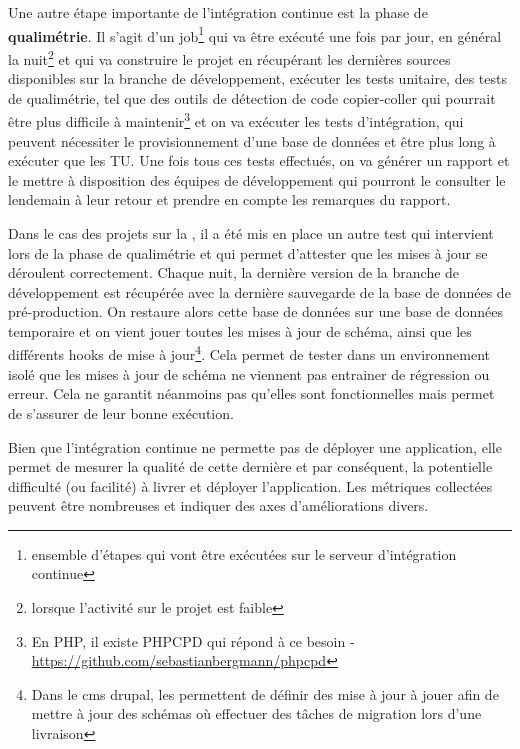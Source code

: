 Une autre étape importante de l'intégration continue est la phase de \textbf{qualimétrie}. Il s'agit d'un job\footnote{ensemble d'étapes qui vont être exécutées sur le serveur d'intégration continue} qui va être exécuté une fois par jour, en général la nuit\footnote{lorsque l'activité sur le projet est faible} et qui va construire le projet en récupérant les dernières sources disponibles sur la branche de développement, exécuter les tests unitaire, des tests de qualimétrie, tel que des outils de détection de code  copier-coller qui pourrait être plus difficile à maintenir\footnote{En \gls{PHP}, il existe PHPCPD qui répond à ce besoin - \url{https://github.com/sebastianbergmann/phpcpd}} et on va exécuter les tests d'intégration, qui peuvent nécessiter le provisionnement d'une base de données et être plus long à exécuter que les \gls{TU}. Une fois tous ces tests effectués, on va générer un rapport et le mettre à disposition des équipes de développement qui pourront le consulter le lendemain à leur retour et prendre en compte les remarques du rapport. 

Dans le cas des projets sur la \naq{}, il a été mis en place un autre test qui intervient lors de la phase de qualimétrie et qui permet d'attester que les mises à jour se déroulent correctement. Chaque nuit, la dernière version de la branche de développement est récupérée avec la dernière sauvegarde de la base de données de pré-production. On restaure alors cette base de données sur une base de données temporaire et on vient jouer toutes les mises à jour de schéma, ainsi que les différents hooks de mise à jour\footnote{Dans le \gls{cms} \gls{drupal}, les  permettent de définir des mise à jour à jouer afin de mettre à jour des schémas où effectuer des tâches de migration lors d'une livraison}. Cela permet de tester dans un environnement isolé que les mises à jour de schéma ne viennent pas entrainer de régression ou erreur. Cela ne garantit néanmoins pas qu'elles sont fonctionnelles mais permet de s'assurer de leur bonne exécution.

Bien que l'intégration continue ne permette pas de déployer une application, elle permet de mesurer la qualité de cette dernière et par conséquent, la potentielle difficulté (ou facilité) à livrer et déployer l'application. Les métriques collectées peuvent être nombreuses et indiquer des axes d'améliorations divers.

